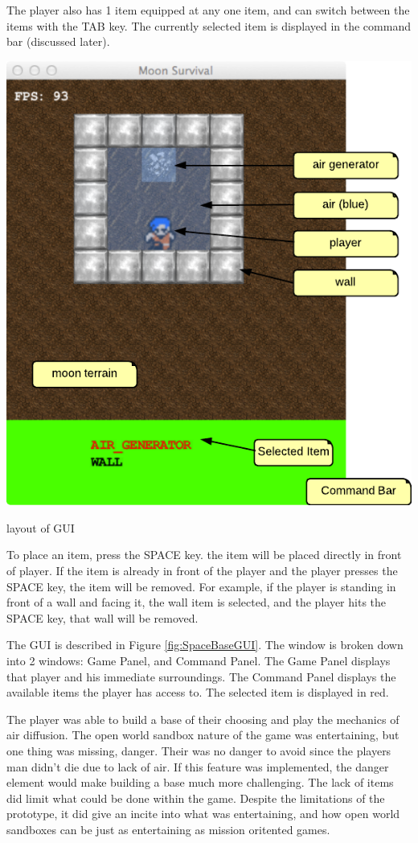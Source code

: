 The player also has 1 item equipped at any one item, and can switch between the items with the TAB key. The currently selected item is displayed in the command bar (discussed later).

\begin{marginfigure}
	\includegraphics{res/space_base_prototype/MoonSurvivalGUI.pdf}
	\caption{layout of GUI}
	\label{fig:SpaceBaseGUI}
\end{marginfigure}

To place an item, press the SPACE key. the item will be placed directly in front of player. 
If the item is already in front of the player and the player presses the SPACE key, the item will be removed.
For example, if the player is standing in front of a wall and facing it, the wall item is selected, and the player hits the SPACE key, that wall will be removed.

The GUI is described in Figure \ref{fig:SpaceBaseGUI}.
The window is broken down into 2 windows: Game Panel, and Command Panel.
The Game Panel displays that player and his immediate surroundings.
The Command Panel displays the available items the player has access to.
The selected item is displayed in red.

The player was able to build a base of their choosing and play the mechanics of air diffusion.
The open world sandbox nature of the game was entertaining, but one thing was missing, danger.
Their was no danger to avoid since the players man didn't die due to lack of air.
If this feature was implemented, the danger element would make building a base much more challenging.
The lack of items did limit what could be done within the game. 
Despite the limitations of the prototype, it did give an incite into what was entertaining, and how open world sandboxes can be just as entertaining as mission oritented games.


